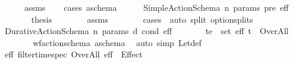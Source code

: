 \begin{isabellebody}
\ \ \ \ %
\endisadelimproof
%
\isatagproof
{}\isamarkupfalse%
\ assms\isanewline
\ \ \isamarkupfalse%
\ {\isacharparenleft}{\kern0pt}cases\ a\isactrlsub s\isactrlsub c\isactrlsub h\isactrlsub e\isactrlsub m\isactrlsub a{\isacharparenright}{\kern0pt}\isanewline
\ \ \ \ \isamarkupfalse%
\ {\isacharparenleft}{\kern0pt}Simple{\isacharunderscore}{\kern0pt}Action{\isacharunderscore}{\kern0pt}Schema\ n\ params\ pre\ eff{\isacharparenright}{\kern0pt}\isanewline
\ \ \ \ \isamarkupfalse%
\ \isamarkupfalse%
\ {\isacharquery}{\kern0pt}thesis\isanewline
\ \ \ \ \ \ \isamarkupfalse%
\ assms\isanewline
\ \ \ \ \ \ \isamarkupfalse%
\ {\isacharparenleft}{\kern0pt}cases\ {\isasympi}{\isacharparenright}{\kern0pt}\ {\isacharparenleft}{\kern0pt}auto\ split{\isacharcolon}{\kern0pt}\ option{\isachardot}{\kern0pt}splits{\isacharparenright}{\kern0pt}\isanewline
\ \ \isamarkupfalse%
\isanewline
\ \ \ \ \isamarkupfalse%
\ {\isacharparenleft}{\kern0pt}Durative{\isacharunderscore}{\kern0pt}Action{\isacharunderscore}{\kern0pt}Schema\ n\ params\ d\ cond\ eff{\isacharparenright}{\kern0pt}\isanewline
\ \ \ \ \isamarkupfalse%
\ \isamarkupfalse%
\ {\isachardoublequoteopen}{\isasymforall}{\isacharparenleft}{\kern0pt}t{\isacharcomma}{\kern0pt}e{\isacharparenright}{\kern0pt}\ {\isasymin}\ set\ eff{\isachardot}{\kern0pt}\ t\ {\isasymnoteq}\ Over{\isacharunderscore}{\kern0pt}All{\isachardoublequoteclose}\isanewline
\ \ \ \ \ \ \isamarkupfalse%
\ {\isacartoucheopen}wf{\isacharunderscore}{\kern0pt}action{\isacharunderscore}{\kern0pt}schema\ a\isactrlsub s\isactrlsub c\isactrlsub h\isactrlsub e\isactrlsub m\isactrlsub a{\isacartoucheclose}\ \isamarkupfalse%
\ {\isacharparenleft}{\kern0pt}auto\ simp{\isacharcolon}{\kern0pt}\ Let{\isacharunderscore}{\kern0pt}def{\isacharparenright}{\kern0pt}\isanewline
\ \ \ \ \isamarkupfalse%
\ \isamarkupfalse%
\ {\isachardoublequoteopen}{\isacharparenleft}{\kern0pt}{\isasymAnd}\isactrlsub e\isactrlsub f\isactrlsub f\ {\isacharparenleft}{\kern0pt}filter{\isacharunderscore}{\kern0pt}time{\isacharunderscore}{\kern0pt}spec\ Over{\isacharunderscore}{\kern0pt}All\ eff{\isacharparenright}{\kern0pt}{\isacharparenright}{\kern0pt}\ {\isacharequal}{\kern0pt}\ Effect\ {\isacharbrackleft}{\kern0pt}{\isacharbrackright}{\kern0pt}\ {\isacharbrackleft}{\kern0pt}{\isacharbrackright}{\kern0pt}{\isachardoublequoteclose}\isanewline

\end{isabellebody}

